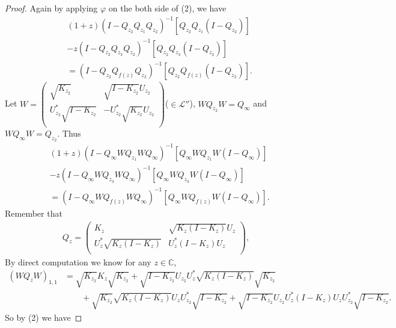 \documentclass{amsart}
\newcommand{\LLL}{\mathcal L} %
\newcommand{\C}{\mathbb C} %
\begin{document}
\begin{proof}
Again by applying $\varphi$ on the both side of (2), we have
\begin{equation}\label{(*)}
\begin{split}
&(1+z)(I - Q_{z_2}Q_{z_1}Q_{z_2})^{-1}[Q_{z_2}Q_{z_1}(I-Q_{z_2})] \\
& - z(I - Q_{z_2}Q_{z_3}Q_{z_2})^{-1}[Q_{z_2}Q_{z_3}(I-Q_{z_2})] \\
&= (I - Q_{z_2}Q_{f(z)}Q_{z_2})^{-1}[Q_{z_2}Q_{f(z)}(I-Q_{z_2})].
\end{split}
\end{equation}
Let $W = \left(
           \begin{array}{cc}
             \sqrt{K_{z_2}} & \sqrt{I-K_{z_2}}U_{z_2} \\
             U^*_{z_2}\sqrt{I-K_{z_2}} & -U^*_{z_2}\sqrt{K_{z_2}}U_{z_2} \\
           \end{array}
         \right)$($\in \LLL''$), $WQ_{z_2}W = Q_{\infty}$ and $WQ_{\infty}W = Q_{z_2}$. Thus
\begin{equation}\label{(*)}
\begin{split}
&(1+z)(I - Q_{\infty}WQ_{z_1}WQ_{\infty})^{-1}[Q_{\infty}WQ_{z_1}W(I-Q_{\infty})] \\
& - z(I - Q_{\infty}WQ_{z_3}WQ_{\infty})^{-1}[Q_{\infty}WQ_{z_3}W(I-Q_{\infty})] \\
&= (I - Q_{\infty}WQ_{f(z)}WQ_{\infty})^{-1}[Q_{\infty}WQ_{f(z)}W(I-Q_{\infty})].
\end{split}
\end{equation}
Remember that
\begin{align*}
Q_{z} = \left(
     \begin{array}{cc}
      K_{z} & \sqrt{K_{z}(I-K_{z})}U_{z} \\
      U_{z}^{*}\sqrt{K_{z}(I-K_{z})} & U_{z}^{*}(I-K_{z})U_{z} \\
  \end{array}
\right),
\end{align*}
By direct computation we know for any $z \in \C$,
\begin{align*}
(WQ_{z}W)_{1,1} &= \sqrt{K_{z_2}}K_{z}\sqrt{K_{z_2}} + \sqrt{I - K_{z_2}}U_{z_2}U^{*}_{z}\sqrt{K_{z} (I - K_{z})}\sqrt{K_{z_2}} \\
                & \qquad +\sqrt{K_{z_2}}\sqrt{K_{z}(I-K_{z})}U_{z}U_{z_2}^{*} \sqrt{I-K_{z_2}} + \sqrt{I-K_{z_2}}U_{z_2}U^{*}_{z}(I - K_z)U_{z}U^{*}_{z_2}\sqrt{I - K_{z_2}}.
\end{align*}
So by (2) we have

\end{proof}
\end{document}
